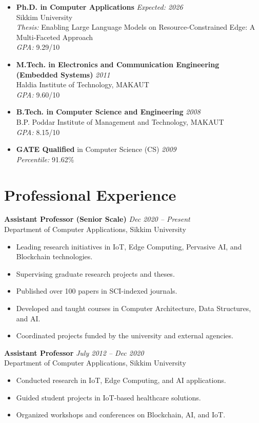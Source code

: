 \documentclass[10pt,a4paper]{article}
\begin{document}
	\begin{itemize}[leftmargin=0.15in]
		\item \textbf{Ph.D. in Computer Applications} \hfill \textit{Expected: 2026}\\
		Sikkim University \\
		\textit{Thesis:} Enabling Large Language Models on Resource-Constrained Edge: A Multi-Faceted Approach \\
		\textit{GPA:} 9.29/10
		\item \textbf{M.Tech. in Electronics and Communication Engineering (Embedded Systems)} \hfill \textit{2011}\\
		Haldia Institute of Technology, MAKAUT \\
		\textit{GPA:} 9.60/10
		\item \textbf{B.Tech. in Computer Science and Engineering} \hfill \textit{2008}\\
		B.P. Poddar Institute of Management and Technology, MAKAUT \\
		\textit{GPA:} 8.15/10
		\item \textbf{GATE Qualified} in Computer Science (CS) \hfill \textit{2009}\\
		\textit{Percentile:} 91.62\%
	\end{itemize}
	
	\section*{Professional Experience}
	
	\textbf{Assistant Professor (Senior Scale)} \hfill \textit{Dec 2020 -- Present}\\
	Department of Computer Applications, Sikkim University
	\begin{itemize}[leftmargin=0.2in]
		\item Leading research initiatives in IoT, Edge Computing, Pervasive AI, and Blockchain technologies.
		\item Supervising graduate research projects and theses.
		\item Published over 100 papers in SCI-indexed journals.
		\item Developed and taught courses in Computer Architecture, Data Structures, and AI.
		\item Coordinated projects funded by the university and external agencies.
	\end{itemize}
	
	\textbf{Assistant Professor} \hfill \textit{July 2012 -- Dec 2020}\\
	Department of Computer Applications, Sikkim University
	\begin{itemize}[leftmargin=0.2in]
		\item Conducted research in IoT, Edge Computing, and AI applications.
		\item Guided student projects in IoT-based healthcare solutions.
		\item Organized workshops and conferences on Blockchain, AI, and IoT.
	\end{itemize}
	
\end{document}
